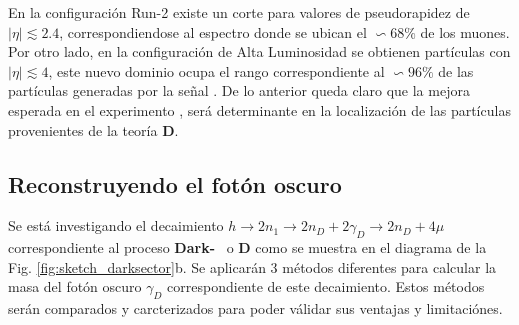 En la configuración  Run-2 existe un corte para valores de pseudorapidez de $|\eta|\lesssim 2.4$, correspondiendose al espectro donde se ubican el $\backsim 68\%$ de los muones. Por otro lado, en la configuración de Alta Luminosidad se obtienen partículas con $|\eta|\lesssim 4$, este nuevo dominio ocupa el rango correspondiente al $\backsim 96\%$ de las partículas generadas por la señal \MC. De lo anterior queda claro que la mejora esperada en el experimento \CMS, será determinante en la localización de las partículas provenientes de la teoría \MSSM\textbf{D}.



\subsection{Reconstruyendo el fotón oscuro}
Se está investigando el decaimiento $h \rightarrow 2n_1 \rightarrow 2n_D + 2\gamma_D \rightarrow 2n_D + 4\mu$ correspondiente al proceso \textbf{Dark-}\SUSY ~ o \MSSM\textbf{D} como se muestra en el diagrama de la Fig. \ref{fig:sketch_darksector}b. Se aplicarán 3 métodos diferentes para calcular la masa del fotón oscuro $\gamma_D$ correspondiente de este decaimiento. Estos métodos serán comparados y carcterizados para poder válidar sus ventajas y limitaciónes.



